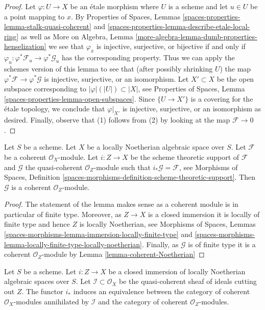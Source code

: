 \begin{proof}
Let $\varphi : U \to X$ be an \'etale morphism where $U$ is a scheme and
let $u \in U$ be a point mapping to $x$. By
Properties of Spaces, Lemmas
\ref{spaces-properties-lemma-stalk-quasi-coherent} and
\ref{spaces-properties-lemma-describe-etale-local-ring}
as well as
More on Algebra, Lemma \ref{more-algebra-lemma-dumb-properties-henselization}
we see that $\varphi_{\overline{x}}$ is injective, surjective, or bijective
if and only if $\varphi_u : \varphi^*\mathcal{F}_u \to \varphi^*\mathcal{G}_u$
has the corresponding property. Thus we can apply the schemes version of
this lemma to see that (after possibly shrinking $U$) the map
$\varphi^*\mathcal{F} \to \varphi^*\mathcal{G}$ is injective, surjective,
or an isomorphism. Let $X' \subset X$ be the open subspace corresponding
to $|\varphi|(|U|) \subset |X|$, see
Properties of Spaces, Lemma \ref{spaces-properties-lemma-open-subspaces}.
Since $\{U \to X'\}$ is a covering for the \'etale topology, we conclude
that $\varphi|_{X'}$ is injective, surjective, or an isomorphism as desired.
Finally, observe that (1) follows from (2) by looking at the map
$\mathcal{F} \to 0$.
\end{proof}

\begin{lemma}
\label{lemma-coherent-support-closed}
Let $S$ be a scheme. Let $X$ be a locally Noetherian algebraic space over $S$.
Let $\mathcal{F}$ be a coherent $\mathcal{O}_X$-module. Let $i : Z \to X$
be the scheme theoretic support of $\mathcal{F}$ and $\mathcal{G}$
the quasi-coherent $\mathcal{O}_Z$-module such that
$i_*\mathcal{G} = \mathcal{F}$, see
Morphisms of Spaces, Definition
\ref{spaces-morphisms-definition-scheme-theoretic-support}.
Then $\mathcal{G}$ is a coherent $\mathcal{O}_Z$-module.
\end{lemma}

\begin{proof}
The statement of the lemma makes sense as a coherent module is in
particular of finite type. Moreover, as $Z \to X$ is a closed immersion
it is locally of finite type and hence $Z$ is locally Noetherian, see
Morphisms of Spaces, Lemmas
\ref{spaces-morphisms-lemma-immersion-locally-finite-type} and
\ref{spaces-morphisms-lemma-locally-finite-type-locally-noetherian}.
Finally, as $\mathcal{G}$ is of finite type it is a coherent
$\mathcal{O}_Z$-module by
Lemma \ref{lemma-coherent-Noetherian}
\end{proof}

\begin{lemma}
\label{lemma-i-star-equivalence}
Let $S$ be a scheme. Let $i : Z \to X$ be a closed immersion of locally
Noetherian algebraic spaces over $S$.
Let $\mathcal{I} \subset \mathcal{O}_X$ be the quasi-coherent sheaf of ideals
cutting out $Z$. The functor $i_*$ induces an equivalence between the
category of coherent $\mathcal{O}_X$-modules annihilated by $\mathcal{I}$
and the category of coherent $\mathcal{O}_Z$-modules.
\end{lemma}

